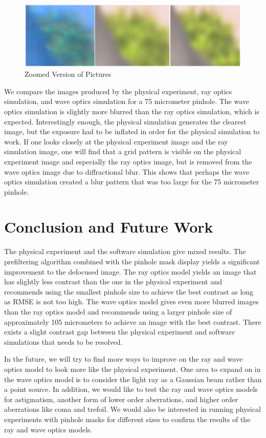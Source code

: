 \begin{figure}[ht]
  \centering
  \includegraphics[width=6in]{chapters/chapter8/images/comparison_zoom.png}
  \caption{Zoomed Version of Pictures }
  \label{fig:ferrari}
\end{figure}

We compare the images produced by the physical experiment, ray optics simulation, and wave optics simulation for a 75 micrometer pinhole. The wave optics simulation is slightly more blurred than the ray optics simulation, which is expected. Interestingly enough, the physical simulation generates the clearest image, but the exposure had to be inflated in order for the physical simulation to work. If one looks closely at the physical experiment image and the ray simulation image, one will find that a grid pattern is visible on the physical experiment image and especially the ray optics image, but is removed from the wave optics image due to diffractional blur. This shows that perhaps the wave optics simulation created a blur pattern that was too large for the 75 micrometer pinhole. 

\section{Conclusion and Future Work}

The physical experiment and the software simulation give mixed results. The prefiltering algorithm combined with the pinhole mask display yields a significant improvement to the defocused image. The ray optics model yields an image that has slightly less contrast than the one in the physical experiment and recommends using the smallest pinhole size to achieve the best contrast as long as RMSE is not too high. The wave optics model gives even more blurred images than the ray optics model and recommends using a larger pinhole size of approximately 105 micrometers to achieve an image with the best contrast. There exists a slight contrast gap between the physical experiment and software simulations that needs to be resolved.

In the future, we will try to find more ways to improve on the ray and wave optics model to look more like the physical experiment. One area to expand on in the wave optics model is to consider the light ray as a Gaussian beam rather than a point source. In addition, we would like to test the ray and wave optics models for astigmatism, another form of lower order aberrations, and higher order aberrations like coma and trefoil. We would also be interested in running physical experiments with pinhole masks for different sizes to confirm the results of the ray and wave optics models. 